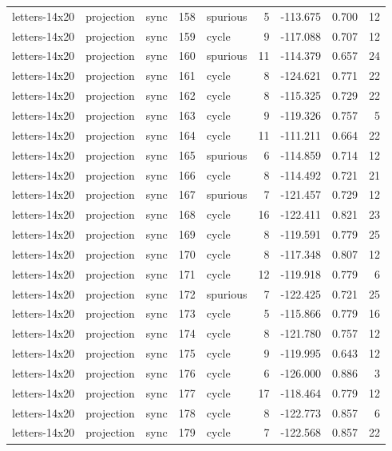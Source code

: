 \begin{tabular}{lllrlrrrr}
letters-14x20 & projection & sync & 158 & spurious & 5 & -113.675 & 0.700 & 12 \\
letters-14x20 & projection & sync & 159 & cycle & 9 & -117.088 & 0.707 & 12 \\
letters-14x20 & projection & sync & 160 & spurious & 11 & -114.379 & 0.657 & 24 \\
letters-14x20 & projection & sync & 161 & cycle & 8 & -124.621 & 0.771 & 22 \\
letters-14x20 & projection & sync & 162 & cycle & 8 & -115.325 & 0.729 & 22 \\
letters-14x20 & projection & sync & 163 & cycle & 9 & -119.326 & 0.757 & 5 \\
letters-14x20 & projection & sync & 164 & cycle & 11 & -111.211 & 0.664 & 22 \\
letters-14x20 & projection & sync & 165 & spurious & 6 & -114.859 & 0.714 & 12 \\
letters-14x20 & projection & sync & 166 & cycle & 8 & -114.492 & 0.721 & 21 \\
letters-14x20 & projection & sync & 167 & spurious & 7 & -121.457 & 0.729 & 12 \\
letters-14x20 & projection & sync & 168 & cycle & 16 & -122.411 & 0.821 & 23 \\
letters-14x20 & projection & sync & 169 & cycle & 8 & -119.591 & 0.779 & 25 \\
letters-14x20 & projection & sync & 170 & cycle & 8 & -117.348 & 0.807 & 12 \\
letters-14x20 & projection & sync & 171 & cycle & 12 & -119.918 & 0.779 & 6 \\
letters-14x20 & projection & sync & 172 & spurious & 7 & -122.425 & 0.721 & 25 \\
letters-14x20 & projection & sync & 173 & cycle & 5 & -115.866 & 0.779 & 16 \\
letters-14x20 & projection & sync & 174 & cycle & 8 & -121.780 & 0.757 & 12 \\
letters-14x20 & projection & sync & 175 & cycle & 9 & -119.995 & 0.643 & 12 \\
letters-14x20 & projection & sync & 176 & cycle & 6 & -126.000 & 0.886 & 3 \\
letters-14x20 & projection & sync & 177 & cycle & 17 & -118.464 & 0.779 & 12 \\
letters-14x20 & projection & sync & 178 & cycle & 8 & -122.773 & 0.857 & 6 \\
letters-14x20 & projection & sync & 179 & cycle & 7 & -122.568 & 0.857 & 22 \\

\end{tabular}
